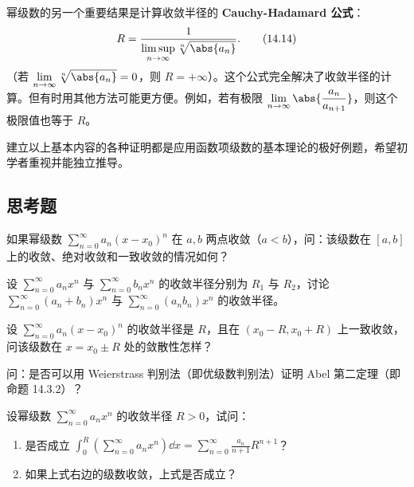 幂级数的另一个重要结果是计算收敛半径的 \textbf{Cauchy-Hadamard 公式}：
\begin{equation}
  R=\frac1{\displaystyle\limsup_{n\to\infty}\sqrt[n]{\abs{a_n}}}.
  \tag{14.14}
  \label{eq:14.14}
\end{equation}
（若 $\displaystyle\lim_{n\to\infty}\sqrt[n]{\abs{a_n}}=0$，则 $R=+\infty$）。这个公式完全解决了收敛半径的计算。但有时用其他方法可能更方便。例如，若有极限 $\displaystyle\lim_{n\to\infty}\abs{\frac{a_n}{a_{n+1}}}$，则这个极限值也等于 $R$。

建立以上基本内容的各种证明都是应用函数项级数的基本理论的极好例题，希望初学者重视并能独立推导。

\subsection{思考题}

\begin{xthought}[1]
如果幂级数 $\displaystyle\sum_{n=0}^{\infty}a_n(x-x_0)^n$ 在 $a,b$ 两点收敛（$a<b$），问：该级数在 $[a,b]$ 上的收敛、绝对收敛和一致收敛的情况如何？
\end{xthought}

\begin{xthought}[2]
设 $\displaystyle\sum_{n=0}^{\infty}a_nx^n$ 与 $\displaystyle\sum_{n=0}^{\infty}b_nx^n$ 的收敛半径分别为 $R_1$ 与 $R_2$，讨论 $\displaystyle\sum_{n=0}^{\infty}(a_n+b_n)x^n$ 与 $\displaystyle\sum_{n=0}^{\infty}(a_nb_n)x^n$ 的收敛半径。
\end{xthought}

\begin{xthought}[3]
设 $\displaystyle\sum_{n=0}^{\infty}a_n(x-x_0)^n$ 的收敛半径是 $R$，且在 $(x_0-R,x_0+R)$ 上一致收敛，问该级数在 $x=x_0\pm R$ 处的敛散性怎样？
\end{xthought}

\begin{xthought}[4]
问：是否可以用 Weierstrass 判别法（即优级数判别法）证明 Abel 第二定理（即命题 14.3.2）？
\end{xthought}

\begin{xthought}[5]
设幂级数 $\displaystyle\sum_{n=0}^{\infty}a_nx^n$ 的收敛半径 $R>0$，试问：
  \begin{enumerate}[label=(\arabic*)]
    \item 是否成立 $\displaystyle\int_0^R\left(\sum_{n=0}^{\infty}a_nx^n\right)\dd x=\sum_{n=0}^{\infty}\frac{a_n}{n+1}R^{n+1}$？
    \item 如果上式右边的级数收敛，上式是否成立？
  \end{enumerate}
\end{xthought}


